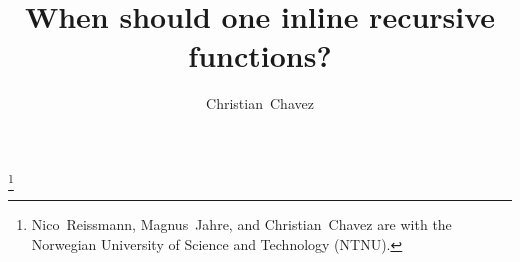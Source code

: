\documentclass[a4paper]{article}
\begin{document}
\title{When should one inline recursive functions?}
\author{Christian~Chavez}
\maketitle

\thanks{Nico~Reissmann, Magnus~Jahre, and Christian~Chavez are with the
Norwegian University of Science and Technology (NTNU).}



\vfill


\clearpage
\tableofcontents

\clearpage












\clearpage
\appendix
\addappheadtotoc

\end{document}

